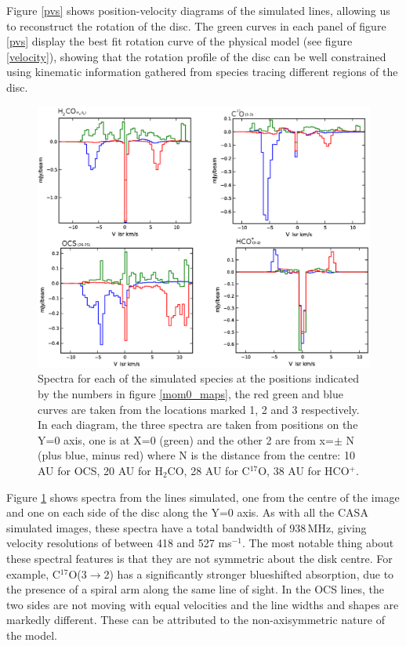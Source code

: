\documentclass[useAMS,usenatbib]{mn2e}
\begin{document}
Figure \ref{pvs} shows position-velocity diagrams of the simulated lines, allowing us to reconstruct the rotation of the disc. The green curves in each panel of figure \ref{pvs} display the best fit rotation curve of the physical model (see figure \ref{velocity}), showing that the rotation profile of the disc can be well constrained using kinematic information gathered from species tracing different regions of the disc.\newline

\begin{figure}
 \includegraphics[width=168mm]{Figures/sim/casa_all_spectra.eps}
 \caption{Spectra for each of the simulated species at the positions indicated by the numbers in figure \ref{mom0_maps}, the red green and blue curves are taken from the locations marked 1, 2 and 3 respectively. In each diagram, the three spectra are taken from positions on the Y=0 axis, one is at X=0 (green) and the other 2 are from x=$\pm$ N (plus blue, minus red) where N is the distance from the centre: 10 AU for OCS, 20 AU for H$_2$CO, 28 AU for C$^{17}$O, 38 AU for HCO$^+$.}
 \label{spectra}
\end{figure}

Figure \ref{spectra} shows spectra from the lines simulated, one from the centre of the image and one on each side of the disc along the Y=0 axis. As with all the CASA simulated images, these spectra have a total bandwidth of 938$\,$MHz, giving velocity resolutions of between 418 and 527 ms$^{-1}$. The most notable thing about these spectral features is that they are not symmetric about the disk centre. For example, C$^{17}$O(3$\rightarrow$2) has a significantly stronger blueshifted absorption, due to the presence of a spiral arm along the same line of sight. In the OCS lines, the two sides are not moving with equal velocities and the line widths and shapes are markedly different. These can be attributed to the non-axisymmetric nature of the model.
\end{document}
